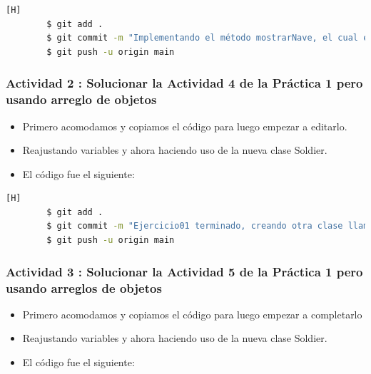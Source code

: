 \documentclass{article}
\begin{document}
    \begin{lstlisting}[language=bash,caption={Commit: Implementando el método mostrarNave, el cual está presente en otros métodos}][H]
		$ git add .
		$ git commit -m "Implementando el método mostrarNave, el cual está presente en otros métodos"
		$ git push -u origin main
    \end{lstlisting}


    
    \subsubsection{Actividad 2 : Solucionar la Actividad 4 de la Práctica 1 pero usando arreglo de objetos}
    \begin{itemize}	
        \item Primero acomodamos y copiamos el código para luego empezar a editarlo.
        \item Reajustando variables y ahora haciendo uso de la nueva clase Soldier.
	\item El código fue el siguiente:
    \end{itemize}
    
    
    
    \begin{lstlisting}[language=bash,caption={Commit: Ejercicio01 terminado, creando otra clase llamada Soldier para los objetos de soldados}][H]
		$ git add .
		$ git commit -m "Ejercicio01 terminado, creando otra clase llamada Soldier para los objetos de soldados"			
		$ git push -u origin main
	\end{lstlisting}



    \subsubsection{Actividad 3 : Solucionar la Actividad 5 de la Práctica 1 pero usando arreglos de objetos}
    \begin{itemize}	
        \item Primero acomodamos y copiamos el código para luego empezar a completarlo
        \item Reajustando variables y ahora haciendo uso de la nueva clase Soldier.
	\item El código fue el siguiente:
    \end{itemize}
    
    
    
\end{document}
